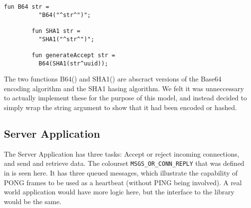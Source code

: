 		
		\begin{lstlisting}[label=lst:generateAccept,caption=generateAccept,gobble=2]
		fun B64 str =
		  "B64("^str^")";
		
		fun SHA1 str =
		  "SHA1("^str^")";

		fun generateAccept str =
		  B64(SHA1(str^uuid));
		\end{lstlisting}
		
		The two functions B64() \cite{rfc4648} and SHA1() \cite{fips.180-2} are
		abscract versions of the Base64 encoding algorithm and the SHA1 hasing algorithm. We felt it was unneccessary
		to actually implement these for the purpose of this model, and instead decided
		to simply wrap the string argument to show that it had been encoded or hashed.
		
\subsection{Server Application}
	
	
	The Server Application has three tasks: Accept or reject incoming connections,
	and send and retrieve data. The colourset \lstinline:MSGS_OR_CONN_REPLY: that
	was defined in  is seen here. It has three
	queued messages, which illustrate the capability of PONG frames to be used as
	a heartbeat (without PING being involved). A real world application would have
	more logic here, but the interface to the library would be the same.
